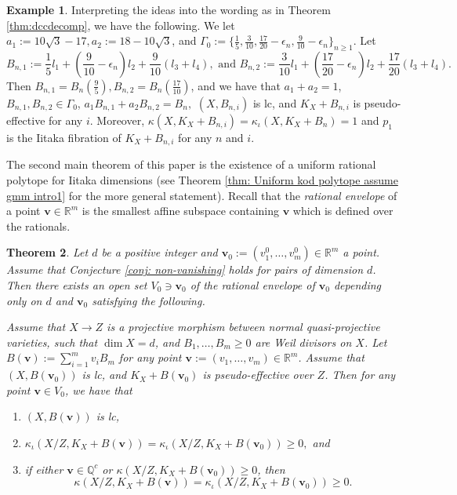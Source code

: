 \documentclass[11pt]{amsart}
\numberwithin{equation}{section}
\newcommand{\Qq}{\mathbb{Q}}
\newcommand{\Rr}{\mathbb{R}}
\newcommand{\Ii}{{\Gamma}}
\newtheorem{thm}{Theorem}[section]
\theoremstyle{definition}
\newtheorem{ex}[thm]{Example}
\theoremstyle{definition}
\begin{document}
\begin{ex}
Interpreting the ideas into the wording as in Theorem \ref{thm:dccdecomp}, we have the following. We let $a_1:=10\sqrt{3}-17, a_2:=18-10\sqrt{3}$, and $\Ii_0:=\{\frac{1}{5},\frac{3}{10},\frac{17}{20}-\epsilon_n,\frac{9}{10}-\epsilon_n\}_{n\ge1}$. Let
$$B_{n,1}:=\frac{1}{5}l_1+(\frac{9}{10}-\epsilon_n)l_2+\frac{9}{10}(l_3+l_4),\text{ and }B_{n,2}:=\frac{3}{10}l_1+(\frac{17}{20}-\epsilon_n)l_2+\frac{17}{20}(l_3+l_4).$$
Then $B_{n,1}=B_n(\frac{9}{5}),B_{n,2}=B_n(\frac{17}{10})$, and we have that $a_1+a_2=1$, $B_{n,1},B_{n,2}\in\Ii_0$, $a_1B_{n,1}+a_2B_{n,2}=B_n,$ $(X,B_{n,i})$ is lc, and $K_X+B_{n,i}$ is pseudo-effective for any $i$. Moreover, $\kappa(X,K_X+B_{n,i})=\kappa_{\iota}(X,K_X+B_n)=1$ and $p_1$ is the Iitaka fibration of $K_X+B_{n,i}$ for any $n$ and $i$.
\end{ex}


The second main theorem of this paper is the existence of a uniform rational polytope for Iitaka dimensions (see Theorem \ref{thm: Uniform kod polytope assume gmm intro1} for the more general statement). Recall that the \emph{rational envelope} of a point $\bm{v}\in\Rr^m$ is the smallest affine subspace containing $\bm{v}$ which is defined over the rationals.

\begin{thm}\label{thm: Uniform kod polytope assume gmm intro}
Let $d$ be a positive integer and $\bm{v}_0:=(v_1^0,\dots,v_m^0)\in\Rr^m$ a point. Assume that Conjecture \ref{conj: non-vanishing} holds for pairs of dimension $d$. Then there exists an open set $V_0\ni\bm{v}_0$ of the rational envelope of $\bm{v}_0$ depending only on $d$ and $\bm{v}_0$ satisfying the following. 

Assume that $X\rightarrow Z$ is a projective morphism between normal quasi-projective varieties, such that $\dim X=d$, and $B_1,\dots,B_m\geq 0$ are Weil divisors on $X$. Let $B(\bm{v}):=\sum_{i=1}^mv_iB_m$ for any point $\bm{v}:=(v_1,\dots,v_m)\in\Rr^m$. Assume that $(X,B(\bm{v}_0))$ is lc, and $K_X+B(\bm{v}_0)$ is pseudo-effective over $Z$. Then for any point $\bm{v}\in V_0$, we have that
\begin{enumerate}
     \item $(X,B(\bm{v}))$ is lc,
    \item $\kappa_{\iota}(X/Z,K_X+B(\bm{v}))=\kappa_{\iota}(X/Z,K_X+B(\bm{v}_0))\geq 0,$ and
    \item if either $\bm{v}\in \Qq^c$ or $\kappa(X/Z,K_X+B(\bm{v}_0))\geq 0$, then 
    $$\kappa(X/Z,K_X+B(\bm{v}))=\kappa_{\iota}(X/Z,K_X+B(\bm{v}_0))\geq 0.$$
\end{enumerate}
\end{thm}
\end{document}
